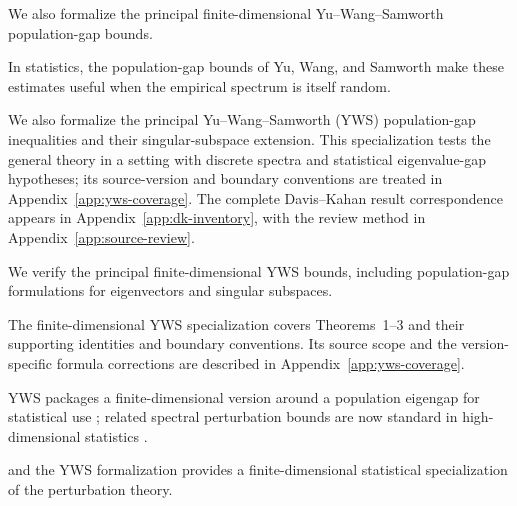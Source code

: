 We also formalize the
principal finite-dimensional Yu--Wang--Samworth population-gap bounds.

In statistics, the
population-gap bounds of Yu, Wang, and Samworth \citep{yu2015davis} make
these estimates useful when the empirical spectrum is itself random.

We also formalize the principal Yu--Wang--Samworth (YWS)
population-gap inequalities and their singular-subspace extension. This
specialization tests the general theory in a setting with discrete spectra
and statistical eigenvalue-gap hypotheses; its source-version and boundary
conventions are treated in Appendix~\ref{app:yws-coverage}. The complete
Davis--Kahan result correspondence appears in
Appendix~\ref{app:dk-inventory}, with the review method in
Appendix~\ref{app:source-review}.

\item We verify the principal finite-dimensional YWS bounds, including
    population-gap formulations for eigenvectors and singular subspaces.

The finite-dimensional YWS specialization covers Theorems~1--3 and
their supporting identities and boundary conventions. Its source scope and the version-specific
formula corrections are described in Appendix~\ref{app:yws-coverage}.

YWS packages a
finite-dimensional version around a population eigengap for statistical use
\citep{yu2015davis}; related spectral perturbation bounds are now standard in
high-dimensional statistics \citep{cape2019two,chen2021spectral}.

and the YWS formalization provides a finite-dimensional statistical
specialization of the perturbation theory.

